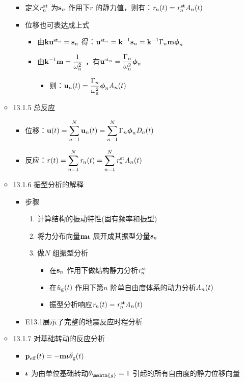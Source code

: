 \documentclass[11pt]{article}
\begin{document}
\begin{itemize}
\begin{itemize}
\begin{itemize}
\item 定义\(\rnst\) 为\(\vsn\) 作用下\(r\) 的静力值，则有：\(\rnt = \rnst \Ant\)
\item 位移也可表达成上式
\begin{itemize}
\item 由\(\vk \vunst = \vsn\) 得：\(\vunst = \vk^{-1} \vsn = \vk^{-1} \Gamman \vm \vphin\)
\item 由\(\vk^{-1}\vm = \dfrac{1}{\omegann}\) ，有\(\vunst = \dfrac{\Gamman}{\omegann}\vphin\)
\begin{itemize}
\item 则：\(\vunt = \dfrac{\Gamman}{\omegann} \vphin \Ant\)
\end{itemize}
\end{itemize}
\end{itemize}
\item 13.1.5 总反应
\label{sec:orge0021ef}
\begin{itemize}
\item 位移：\(\vut = \sumn \vunt =  \sumn \Gamman \vphin \Dnt\)
\item 反应：\(\rt = \sumn \rnt = \sumn \rnst \Ant\)
\end{itemize}
\item 13.1.6 振型分析的解释
\label{sec:org6931e7d}
\begin{itemize}
\item 步骤
\begin{enumerate}
\item 计算结构的振动特性(固有频率和振型)
\item 将力分布向量\(\vm\viota\) 展开成其振型分量\(\vsn\)
\item 做\(N\) 组振型分析
\begin{itemize}
\item 在\(\vsn\) 作用下做结构静力分析\(\rnst\)
\item 在\(\ddugt\) 作用下第\(n\) 阶单自由度体系的动力分析\(\Ant\)
\item 振型分析响应\(\rnt=\rnst \Ant\)
\end{itemize}
\end{enumerate}
\item E13.1展示了完整的地震反应时程分析
\end{itemize}
\item 13.1.7 对基础转动的反应分析
\label{sec:orga443907}
\begin{itemize}
\item \(\vpefft= - \vm \viota \ddthetagt\)
\item \(\viota\) 为由单位基础转动\(\theta_{\mahtm{g}} =1\) 引起的所有自由度的静力位移向量

\end{itemize}
\end{itemize}
\end{itemize}
\end{document}
